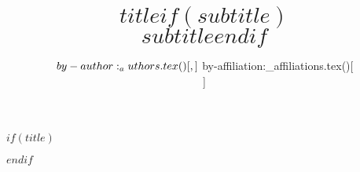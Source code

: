 $if(title)$
\title{$title$$if(subtitle)$\\\vspace{\baselineskip}\large\uppercase{$subtitle$}\vspace{\baselineskip}$endif$}
$endif$
\author{${  by-author:_authors.tex()[, ] }\vspace{\baselineskip}\\\\ ${  by-affiliation:_affiliations.tex()[\\ ] }}

\date{ }